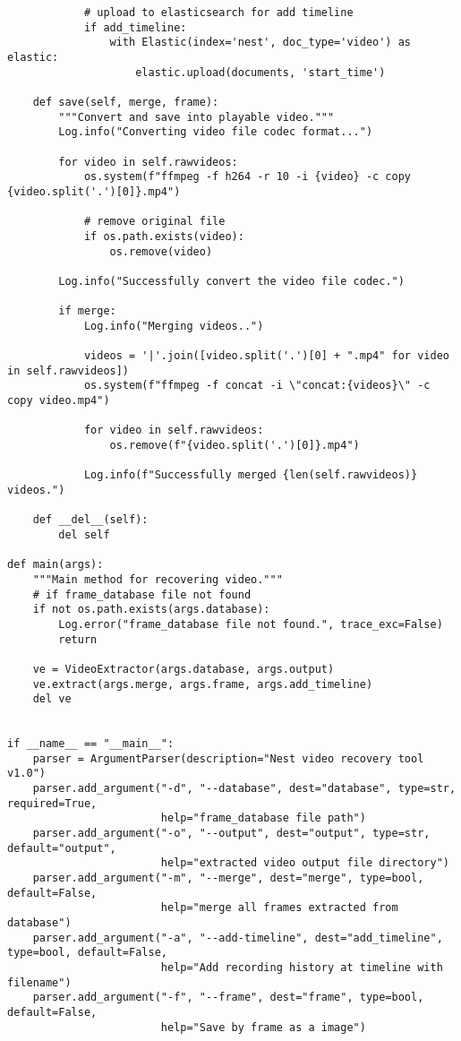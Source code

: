 \documentclass{easychair}
\begin{document}
\begin{enumerate}
\begin{lstlisting}
            # upload to elasticsearch for add timeline
            if add_timeline:
                with Elastic(index='nest', doc_type='video') as elastic:
                    elastic.upload(documents, 'start_time')

    def save(self, merge, frame):
        """Convert and save into playable video."""
        Log.info("Converting video file codec format...")

        for video in self.rawvideos:
            os.system(f"ffmpeg -f h264 -r 10 -i {video} -c copy {video.split('.')[0]}.mp4")

            # remove original file
            if os.path.exists(video):
                os.remove(video)

        Log.info("Successfully convert the video file codec.")

        if merge:
            Log.info("Merging videos..")

            videos = '|'.join([video.split('.')[0] + ".mp4" for video in self.rawvideos])
            os.system(f"ffmpeg -f concat -i \"concat:{videos}\" -c copy video.mp4")

            for video in self.rawvideos:
                os.remove(f"{video.split('.')[0]}.mp4")

            Log.info(f"Successfully merged {len(self.rawvideos)} videos.")

    def __del__(self):
        del self

def main(args):
    """Main method for recovering video."""
    # if frame_database file not found
    if not os.path.exists(args.database):
        Log.error("frame_database file not found.", trace_exc=False)
        return

    ve = VideoExtractor(args.database, args.output)
    ve.extract(args.merge, args.frame, args.add_timeline)
    del ve


if __name__ == "__main__":
    parser = ArgumentParser(description="Nest video recovery tool v1.0")
    parser.add_argument("-d", "--database", dest="database", type=str, required=True,
                        help="frame_database file path")
    parser.add_argument("-o", "--output", dest="output", type=str, default="output",
                        help="extracted video output file directory")
    parser.add_argument("-m", "--merge", dest="merge", type=bool, default=False,
                        help="merge all frames extracted from database")
    parser.add_argument("-a", "--add-timeline", dest="add_timeline", type=bool, default=False,
                        help="Add recording history at timeline with filename")
    parser.add_argument("-f", "--frame", dest="frame", type=bool, default=False,
                        help="Save by frame as a image")


\end{lstlisting}
\end{enumerate}
\end{document}
